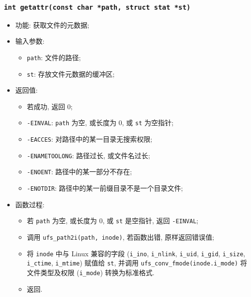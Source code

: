 \documentclass[nofonts, titlepage]{ctexart}
\begin{document}
  \subsubsection[\texttt{getattr}]{\texttt{int getattr(const char *path, struct stat *st)}}
  \begin{itemize}
\item
  功能: 获取文件的元数据;
\item
  输入参数:

  \begin{itemize}
  \item
    \texttt{path}: 文件的路径;
  \item
    \texttt{st}: 存放文件元数据的缓冲区;
  \end{itemize}
\item
  返回值:

  \begin{itemize}
  \item
    若成功, 返回 0;
  \item
    \texttt{-EINVAL}: \texttt{path} 为空, 或长度为 0, 或 \texttt{st}
    为空指针;
  \item
    \texttt{-EACCES}: 对路径中的某一目录无搜索权限;
  \item
    \texttt{-ENAMETOOLONG}: 路径过长, 或文件名过长;
  \item
    \texttt{-ENOENT}: 路径中的某一部分不存在;
  \item
    \texttt{-ENOTDIR}: 路径中的某一前缀目录不是一个目录文件;
  \end{itemize}
\item
  函数过程:

  \begin{itemize}
  \item
    若 \texttt{path} 为空, 或长度为 0, 或 \texttt{st} 是空指针, 返回
    \texttt{-EINVAL};
  \item
    调用 \texttt{ufs\_path2i(path, inode)}, 若函数出错, 原样返回错误值;
  \item
    将 \texttt{inode} 中与 Linux 兼容的字段 (\texttt{i\_ino},
    \texttt{i\_nlink}, \texttt{i\_uid}, \texttt{i\_gid},
    \texttt{i\_size}, \texttt{i\_ctime}, \texttt{i\_mtime}) 赋值给
    \texttt{st}, 并调用 \texttt{ufs\_conv\_fmode(inode.i\_mode)} 将
    文件类型及权限 (\texttt{i\_mode}) 转换为标准格式.
  \item
    返回.
  \end{itemize}
  \end{itemize}
\end{document}
